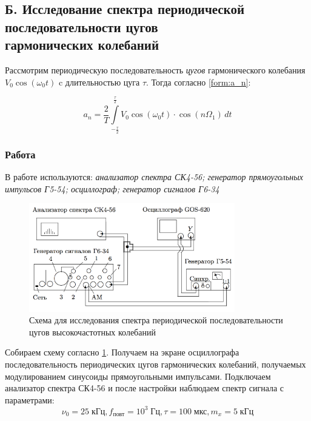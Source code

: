 \documentclass[a4paper, 12pt]{article}
\begin{document}
\subsection*{Б. Исследование спектра периодической последовательности цугов \\ гармонических колебаний}

Рассмотрим периодическую последовательность {\it{цугов}} гармонического колебания \\
$V_0 \cos (\omega_0 t)$ c длительностью цуга $\tau$.
Тогда согласно \ref{form:a_n}:

\begin{equation}
\label{form:cug_a_n}
a_n = \frac{2}{T}\int\limits_{ -\frac{\tau}{2} } ^ {\frac{\tau}{2} } V_0\cos(\omega_0t)\cdot \cos(n\Omega_1)\, dt
\end{equation}

\subsubsection*{Работа}

В работе используются: \textit{анализатор спектра СК4-56; генератор прямоугольных импульсов Г5-54; осциллограф; генератор сигналов Г6-34}

\begin{figure}[H]
\centering
\includegraphics[width = 0.8\textwidth]{schemeB}
\caption{Схема для исследования спектра периодической последовательности цугов высокочастотных колебаний}
\label{img:scheme B}
\end{figure}

Собираем схему согласно \ref{img:scheme B}. Получаем на экране осциллографа последовательность периодических цугов гармонических колебаний, получаемых модулированием синусоиды прямоугольными импульсами. Подключаем анализатор спектра СК4-56 и после настройки наблюдаем спектр сигнала с параметрами: $$ \nu_0 = 25 \; \text{кГц}, f_\text{повт} = 10^3 \; \text{Гц}, \tau = 100 \; \text{мкс}, m_x = 5 \; \text{кГц}$$
\end{document}
